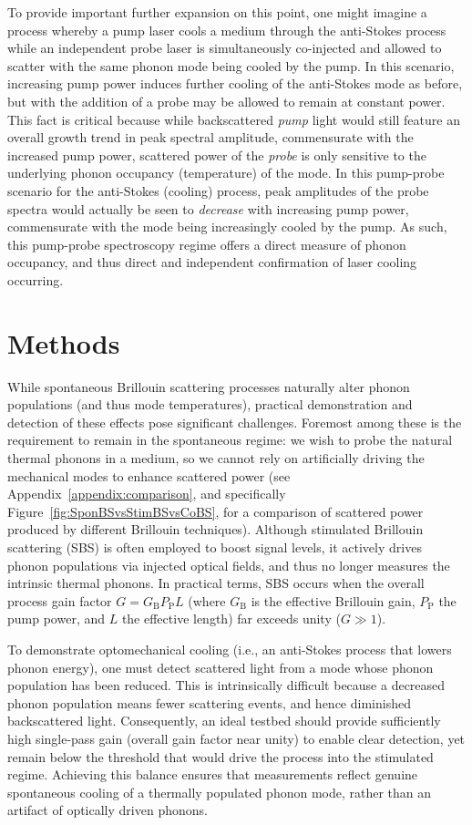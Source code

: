 To provide important further expansion on this point, one might imagine a process whereby a pump laser cools a medium through the anti-Stokes process while an independent probe laser is simultaneously co-injected and allowed to scatter with the same phonon mode being cooled by the pump. In this scenario, increasing pump power induces further cooling of the anti-Stokes mode as before, but with the addition of a probe may be allowed to remain at constant power. This fact is critical because while backscattered \emph{pump} light would still feature an overall growth trend in peak spectral amplitude, commensurate with the increased pump power, scattered power of the \emph{probe} is only sensitive to the underlying phonon occupancy (temperature) of the mode. In this pump-probe scenario for the anti-Stokes (cooling) process, peak amplitudes of the probe spectra would actually be seen to \emph{decrease} with increasing pump power, commensurate with the mode being increasingly cooled by the pump. As such, this pump-probe spectroscopy regime offers a direct measure of phonon occupancy, and thus direct and independent confirmation of laser cooling occurring.

\section{Methods}
\label{Cooling:sec:Methods}

While spontaneous Brillouin scattering processes naturally alter phonon populations (and thus mode temperatures), practical demonstration and detection of these effects pose significant challenges. Foremost among these is the requirement to remain in the spontaneous regime: we wish to probe the natural thermal phonons in a medium, so we cannot rely on artificially driving the mechanical modes to enhance scattered power (see Appendix~\ref{appendix:comparison}, and specifically Figure~\ref{fig:SponBSvsStimBSvsCoBS}, for a comparison of scattered power produced by different Brillouin techniques). Although stimulated Brillouin scattering (SBS) is often employed to boost signal levels, it actively drives phonon populations via injected optical fields, and thus no longer measures the intrinsic thermal phonons. In practical terms, SBS occurs when the overall process gain factor \(G = G_{\mathrm{B}}P_{\mathrm{P}}L\) (where \(G_{\mathrm{B}}\) is the effective Brillouin gain, \(P_{\mathrm{P}}\) the pump power, and \(L\) the effective length) far exceeds unity (\(G \gg 1\)).

To demonstrate optomechanical cooling (i.e., an anti-Stokes process that lowers phonon energy), one must detect scattered light from a mode whose phonon population has been reduced. This is intrinsically difficult because a decreased phonon population means fewer scattering events, and hence diminished backscattered light. Consequently, an ideal testbed should provide sufficiently high single-pass gain (overall gain factor near unity) to enable clear detection, yet remain below the threshold that would drive the process into the stimulated regime. Achieving this balance ensures that measurements reflect genuine spontaneous cooling of a thermally populated phonon mode, rather than an artifact of optically driven phonons.

